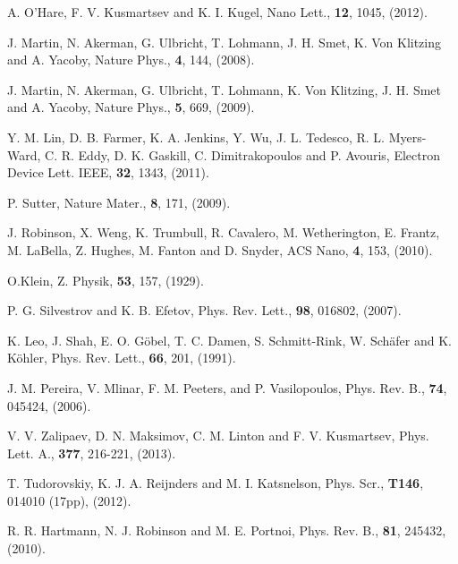 \documentclass[prl,twocolumn,aps,superscriptaddress,floatfix,10pt]{revtex4}
\begin{document}
\begin{thebibliography}{10}


A. O'Hare, F. V. Kusmartsev and K. I. Kugel,
\newblock Nano Lett., {\bf 12}, 1045, (2012).

J. Martin, N. Akerman, G. Ulbricht, T. Lohmann, J. H. Smet, K. Von Klitzing and A. Yacoby,
\newblock Nature Phys., {\bf 4}, 144, (2008).

J. Martin, N. Akerman, G. Ulbricht, T. Lohmann, K. Von Klitzing, J. H. Smet and A. Yacoby,
\newblock Nature Phys., {\bf 5}, 669, (2009).

Y. M. Lin, D. B. Farmer, K. A. Jenkins, Y. Wu, J. L. Tedesco, R. L. Myers-Ward, C. R. Eddy, D. K. Gaskill, C. Dimitrakopoulos and P. Avouris,
\newblock Electron Device Lett. IEEE, {\bf 32}, 1343, (2011).

P. Sutter,
\newblock Nature Mater., {\bf 8}, 171, (2009).

J. Robinson, X. Weng, K. Trumbull, R. Cavalero, M. Wetherington, E. Frantz, M. LaBella, Z. Hughes, M. Fanton and D. Snyder,
\newblock ACS Nano, {\bf 4}, 153, (2010).

 O.Klein, %
Z. Physik, {\bf 53}, 157, (1929).

P. G. Silvestrov and K. B. Efetov,
\newblock Phys. Rev. Lett., {\bf 98}, 016802, (2007).

K. Leo, J. Shah, E. O. G\"{o}bel, T. C. Damen, S. Schmitt-Rink, W. Sch\"{a}fer and K. K\"{o}hler,
\newblock Phys. Rev. Lett., {\bf 66}, 201, (1991).

J. M. Pereira, V. Mlinar, F. M. Peeters, and P. Vasilopoulos,
\newblock Phys. Rev. B., {\bf 74}, 045424, (2006).

V. V. Zalipaev, D. N. Maksimov, C. M. Linton and F. V. Kusmartsev,
\newblock Phys. Lett. A., {\bf 377}, 216-221, (2013).

T. Tudorovskiy, K. J. A. Reijnders and M. I. Katsnelson,
\newblock Phys. Scr., {\bf T146}, 014010 (17pp), (2012).

R. R. Hartmann, N. J. Robinson and M. E. Portnoi,
\newblock Phys. Rev. B., {\bf 81}, 245432, (2010).


\end{thebibliography}
\end{document}
